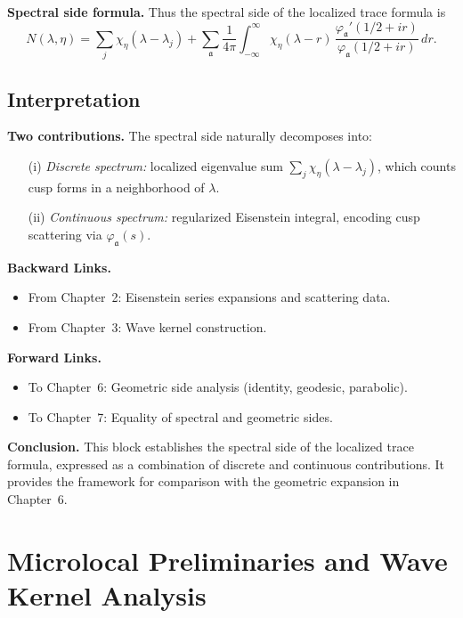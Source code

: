 \medskip

\noindent\textbf{Spectral side formula.}
Thus the spectral side of the localized trace formula is
\[
  N(\lambda,\eta)
  = \sum_j \chi_\eta(\lambda-\lambda_j)
  + \sum_\mathfrak{a} \frac{1}{4\pi}\int_{-\infty}^\infty
    \chi_\eta(\lambda-r)\,
    \frac{\varphi_\mathfrak{a}'(1/2+ir)}{\varphi_\mathfrak{a}(1/2+ir)}\, dr.
\]

\subsection{Interpretation}

\noindent\textbf{Two contributions.}
The spectral side naturally decomposes into:
\begin{itemize}
  \item[(i)] \emph{Discrete spectrum:} localized eigenvalue sum
  $\sum_j \chi_\eta(\lambda-\lambda_j)$,
  which counts cusp forms in a neighborhood of $\lambda$.
  \item[(ii)] \emph{Continuous spectrum:} regularized Eisenstein integral,
  encoding cusp scattering via $\varphi_\mathfrak{a}(s)$.
\end{itemize}

\medskip

\noindent\textbf{Backward Links.}
\begin{itemize}
  \item From Chapter~2: Eisenstein series expansions and scattering data.
  \item From Chapter~3: Wave kernel construction.
\end{itemize}

\noindent\textbf{Forward Links.}
\begin{itemize}
  \item To Chapter~6: Geometric side analysis (identity, geodesic, parabolic).
  \item To Chapter~7: Equality of spectral and geometric sides.
\end{itemize}

\medskip

\noindent\textbf{Conclusion.}
This block establishes the spectral side of the localized trace formula,
expressed as a combination of discrete and continuous contributions.
It provides the framework for comparison with the geometric expansion in Chapter~6.


\section{Microlocal Preliminaries and Wave Kernel Analysis}

